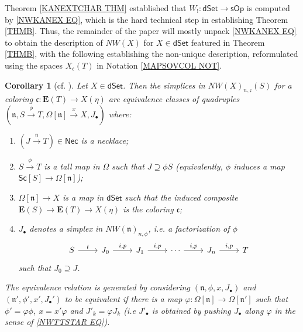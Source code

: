 \documentclass[a4paper,10pt
,draft
]{article}%
\numberwithin{equation}{section}
\numberwithin{figure}{section}
\newtheorem{corollary}[equation]{Corollary}%
\theoremstyle{definition} %
\newcommand{\sOp}{\ensuremath{\mathsf{sOp}}}%
\newcommand{\dSet}{\mathsf{dSet}}
\newcommand{\1}{\ensuremath{\mathbbm 1}}%
\begin{document}
Theorem \ref{KANEXTCHAR THM} established that 
$W_!\colon \dSet \to \sOp$ is computed by \eqref{NWKANEX EQ},
which is the hard technical step in establishing Theorem \ref{THMB}.
Thus, the remainder of the paper will mostly unpack \eqref{NWKANEX EQ}
to obtain the description of $NW(X)$ for $X \in \dSet$
featured in Theorem \ref{THMB},
with the following establishing the non-unique
description,
reformulated using the spaces $X_{\mathfrak{c}}(T)$ in
Notation \ref{MAPSOVCOL NOT}.


\begin{corollary}[{cf. \cite[Cor. 4.4]{DS11}}]
	\label{NWXREPS COR}
	Let $X\in \mathsf{dSet}$.
	Then the simplices in
	$NW(X)_{n,\mathfrak{c}}(S)$
	for a coloring 
	$\mathfrak{c}\colon \boldsymbol{E}(T) \to X(\eta)$
	are equivalence classes of quadruples
	$(\mathfrak{n}, S \xrightarrow{\phi} T, \Omega[\mathfrak{n}] \xrightarrow{x} X, J_{\bullet})$ 
	where:
	\begin{enumerate}[label=(\roman*)]
		\item $(J \xrightarrow{\mathfrak{n}} T) \in \mathsf{Nec}$ is a necklace; 
		\item $S \xrightarrow{\phi} T$
		is a tall map in $\Omega$
		such that $J \supseteq \phi S$
		(equivalently, $\phi$ induces a map
		$\mathsf{Sc}[S] \to \Omega[\mathfrak{n}]$);		
		\item $\Omega[ \mathfrak{n}] \to X$ is a map in $\mathsf{dSet}$
		such that the induced composite
		$\boldsymbol{E}(S) \to 
		\boldsymbol{E}(T) \to X(\eta)$
		is the coloring $\mathfrak{c}$;
		\item $J_{\bullet}$ denotes a simplex in $NW(\mathfrak{n})_{n,\phi}$, i.e.
		a factorization of $\phi$	
	\begin{equation}\label{STRINCOR EQ}
	\begin{tikzcd}
		S \ar{r}{t}
	&
		J_0 \ar{r}{i,p}
	&
		J_1 \ar{r}{i,p}
	&
		\cdots
		\ar{r}{i,p}
	&
		J_n \ar{r}{i,p}
	&
		T
	\end{tikzcd}
	\end{equation}
		such that 
		$J_0 \supseteq J$.
	\end{enumerate}
%
The equivalence relation is generated by considering 
$(\mathfrak{n},\phi,x,J_{\bullet})$ and
$(\mathfrak{n}',\phi',x',J_{\bullet}')$
to be equivalent if there is
a map
$\varphi \colon \Omega[\mathfrak{n}] \to \Omega[\mathfrak{n}']$
such that
$\phi' = \varphi \phi$,
$x = x' \varphi $
and
$J'_k = \varphi J_k$
(i.e $J'_{\bullet}$
is obtained by pushing 
$J_{\bullet}$ along $\varphi$
in the sense of \eqref{NWTTSTAR EQ}).
\end{corollary}
\end{document}

